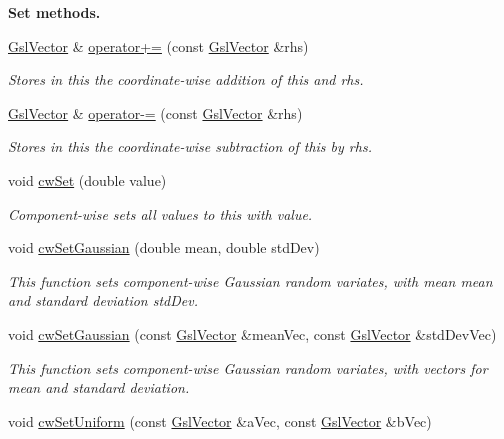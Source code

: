 \begin{Indent}{\bf Set methods.}
\begin{DoxyCompactItemize}
\hyperlink{class_q_u_e_s_o_1_1_gsl_vector}{Gsl\-Vector} \& \hyperlink{class_q_u_e_s_o_1_1_gsl_vector_ae736e2bfbeb9f14a78f33cbbaa6acb19}{operator+=} (const \hyperlink{class_q_u_e_s_o_1_1_gsl_vector}{Gsl\-Vector} \&rhs)
\begin{DoxyCompactList}\small\item\em Stores in {\ttfamily this} the coordinate-\/wise addition of {\ttfamily this} and rhs. \end{DoxyCompactList}\item 
\hyperlink{class_q_u_e_s_o_1_1_gsl_vector}{Gsl\-Vector} \& \hyperlink{class_q_u_e_s_o_1_1_gsl_vector_ac1df668b8aa9a5e1a482ab85a1b0692d}{operator-\/=} (const \hyperlink{class_q_u_e_s_o_1_1_gsl_vector}{Gsl\-Vector} \&rhs)
\begin{DoxyCompactList}\small\item\em Stores in {\ttfamily this} the coordinate-\/wise subtraction of {\ttfamily this} by rhs. \end{DoxyCompactList}\item 
void \hyperlink{class_q_u_e_s_o_1_1_gsl_vector_a706d70a875a0e0c0f091e794c8baece5}{cw\-Set} (double value)
\begin{DoxyCompactList}\small\item\em Component-\/wise sets all values to {\ttfamily this} with value. \end{DoxyCompactList}\item 
void \hyperlink{class_q_u_e_s_o_1_1_gsl_vector_a10ad46b42ea27ee0085d89b4e09b075f}{cw\-Set\-Gaussian} (double mean, double std\-Dev)
\begin{DoxyCompactList}\small\item\em This function sets component-\/wise Gaussian random variates, with mean mean and standard deviation std\-Dev. \end{DoxyCompactList}\item 
void \hyperlink{class_q_u_e_s_o_1_1_gsl_vector_a1f13ee9d573dbab8f8efdba30fe840f2}{cw\-Set\-Gaussian} (const \hyperlink{class_q_u_e_s_o_1_1_gsl_vector}{Gsl\-Vector} \&mean\-Vec, const \hyperlink{class_q_u_e_s_o_1_1_gsl_vector}{Gsl\-Vector} \&std\-Dev\-Vec)
\begin{DoxyCompactList}\small\item\em This function sets component-\/wise Gaussian random variates, with vectors for mean and standard deviation. \end{DoxyCompactList}\item 
void \hyperlink{class_q_u_e_s_o_1_1_gsl_vector_a020583cdb101420d2ac34d8cd5c4c270}{cw\-Set\-Uniform} (const \hyperlink{class_q_u_e_s_o_1_1_gsl_vector}{Gsl\-Vector} \&a\-Vec, const \hyperlink{class_q_u_e_s_o_1_1_gsl_vector}{Gsl\-Vector} \&b\-Vec)

\end{DoxyCompactItemize}
\end{Indent}
